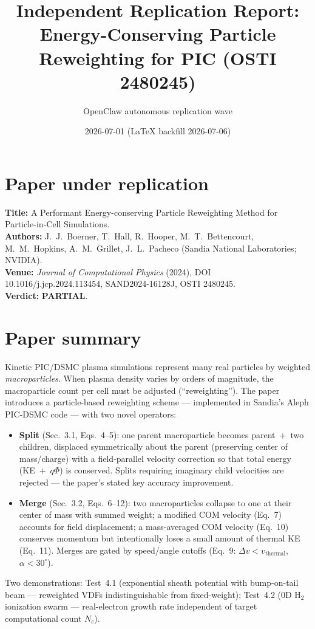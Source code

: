 \documentclass[11pt]{article}
\title{Independent Replication Report: Energy-Conserving Particle Reweighting for PIC (OSTI 2480245)}
\author{OpenClaw autonomous replication wave}
\date{2026-07-01 (LaTeX backfill 2026-07-06)}
\begin{document}
\maketitle

\section*{Paper under replication}
\textbf{Title:} A Performant Energy-conserving Particle Reweighting Method for Particle-in-Cell Simulations. \\
\textbf{Authors:} J.\ J.\ Boerner, T.\ Hall, R.\ Hooper, M.\ T.\ Bettencourt, M.\ M.\ Hopkins, A.\ M.\ Grillet, J.\ L.\ Pacheco (Sandia National Laboratories; NVIDIA). \\
\textbf{Venue:} \emph{Journal of Computational Physics} (2024), DOI 10.1016/j.jcp.2024.113454, SAND2024-16128J, OSTI 2480245. \\
\textbf{Verdict:} \textbf{PARTIAL}.

\section{Paper summary}
Kinetic PIC/DSMC plasma simulations represent many real particles by weighted \emph{macroparticles}. When plasma density varies by orders of magnitude, the macroparticle count per cell must be adjusted (``reweighting''). The paper introduces a particle-based reweighting scheme --- implemented in Sandia's Aleph PIC-DSMC code --- with two novel operators:
\begin{itemize}
  \item \textbf{Split} (Sec.~3.1, Eqs.~4--5): one parent macroparticle becomes parent~$+$~two children, displaced symmetrically about the parent (preserving center of mass/charge) with a field-parallel velocity correction so that total energy (KE~$+$~$q\Phi$) is conserved. Splits requiring imaginary child velocities are rejected --- the paper's stated key accuracy improvement.
  \item \textbf{Merge} (Sec.~3.2, Eqs.~6--12): two macroparticles collapse to one at their center of mass with summed weight; a modified COM velocity (Eq.~7) accounts for field displacement; a mass-averaged COM velocity (Eq.~10) conserves momentum but intentionally loses a small amount of thermal KE (Eq.~11). Merges are gated by speed/angle cutoffs (Eq.~9: $\Delta v < v_{\mathrm{thermal}}$, $\alpha < 30^\circ$).
\end{itemize}
Two demonstrations: Test~4.1 (exponential sheath potential with bump-on-tail beam --- reweighted VDFs indistinguishable from fixed-weight); Test~4.2 (0D H$_2$ ionization swarm --- real-electron growth rate independent of target computational count $N_c$).
\end{document}
